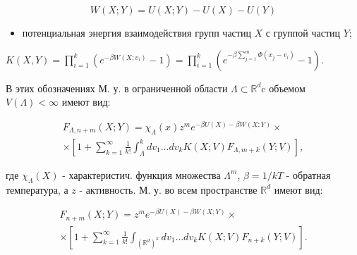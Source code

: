 \documentclass[10pt]{article}
\begin{document}
\[

W(X ; Y)=U(X ; Y)-U(X)-U(Y)

\]



\begin{itemize}

  \item потенциальная энергия взаимодействия групп частиц $X$ с группой частиц $Y$;

\end{itemize}



$K(X, Y)=\prod_{i=1}^{k}\left(e^{-\beta W\left(X ; v_{i}\right)}-1\right)=\prod_{i=1}^{k}\left(e^{-\beta \sum_{j=1}^{m} \Phi\left(x_{j}-v_{i}\right)}-1\right)$.



В этих обозначениях М. у. в ограниченной области $\Lambda \subset \mathbb{R}^{d} \mathrm{c}$ объемом $V(\Lambda)<\infty$ имеют вид:



\[

\begin{gathered}

F_{\Lambda, n+m}(X ; Y)=\chi_{\Lambda}(x) z^{m} e^{-\beta U(X)-\beta W(X ; Y)} \times \\

\times\left[1+\sum_{k=1}^{\infty} \frac{1}{k !} \int_{\Lambda}^{k} d v_{1} \ldots d v_{k} K(X ; V) F_{\Lambda, m+k}(Y ; V)\right],

\end{gathered}

\]



где $\chi_{\Lambda}(X)$ - характеристич. функция множества $\Lambda^{m}$, $\beta=1 / k T$ - обратная температура, а $z$ - активность. М. у. во всем пространстве $\mathbb{R}^{d}$ имеют вид:



\[

\begin{gathered}

F_{n+m}(X ; Y)=z^{m} e^{-\beta U(X)-\beta W(X ; Y)} \times \\

\times\left[1+\sum_{k=1}^{\infty} \frac{1}{k !} \int_{\left(\mathbb{R}^{d}\right)^{k}} d v_{1} \ldots d v_{k} K(X ; V) F_{n+k}(Y ; V)\right] .

\end{gathered}

\]
\end{document}
